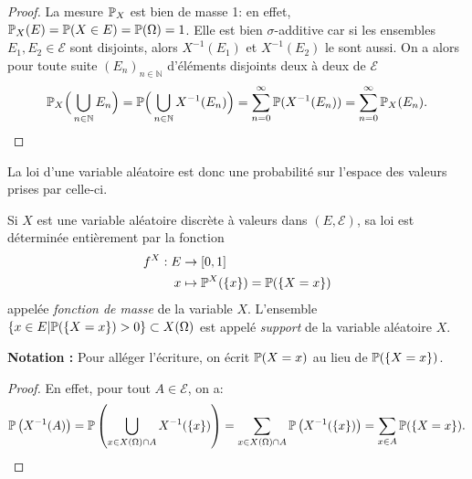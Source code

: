 \begin{proof}
	La mesure $\P_X$ est bien de masse 1: en effet, $\P_X(E) = \P(X\in E) = \P(\Omega) =1$. Elle est bien $\sigma$-additive car si les ensembles $E_1,E_2 \in \mathcal E$ sont disjoints, alors $X^{-1}(E_1)$ et $X^{-1}(E_2)$ le sont aussi. On a alors pour toute suite $(E_n)_{n \in \mathbb{N}}$ d'éléments disjoints deux à deux de $\mathcal{E}$
	\[
		\P_X\Big(\bigcup_{n\in \N} E_n \Big) =  \mathbb{P} \Big( \bigcup_{n \in \mathbb{N}} X^{-1}(E_n) \Big) = \sum_{n=0}^{\infty} \mathbb{P} (X^{-1}(E_n)) =  \sum_{n=0}^{\infty} \mathbb{P}_X (E_n). \qedhere
	\]
\end{proof}

La loi d'une variable aléatoire est donc une probabilité sur l'espace des valeurs prises par celle-ci. 

\begin{defprop}
	Si $X$ est une variable aléatoire discrète à valeurs dans $(E,\mathcal{E})$, sa loi est déterminée entièrement par la fonction 
	\begin{align*} f^X:E &\to [0,1] \\ x &\mapsto  \P^X(\{x\}) = \mathbb{P}(\{X=x\})\end{align*}
	appelée \emph{fonction de masse} de la variable $X$. L'ensemble $\{x\in E | \P(\{X=x\} ) >0 \} \subset X(\Omega)$ est appelé \emph{support} de la variable aléatoire $X$.
\end{defprop}

{\bf\sffamily Notation :} Pour alléger l'écriture, on écrit $\P( X=x)$ au lieu de $\P(\{X=x\})$.
\begin{proof}
	En effet, pour tout $A \in \mathcal{E}$, on a:
	\[ \mathbb{P} \left(X^{-1}(A)\right) = \mathbb{P} \left( \bigcup_{x \in X(\Omega) \cap A} X^{-1}(\{x\}) \right)  = \sum_{x \in X(\Omega) \cap A} \mathbb{P} \left( X^{-1}(\{x\}) \right)  = \sum_{x \in A} \mathbb{P} ( \{X=x \} ).\qedhere\]
\end{proof}

